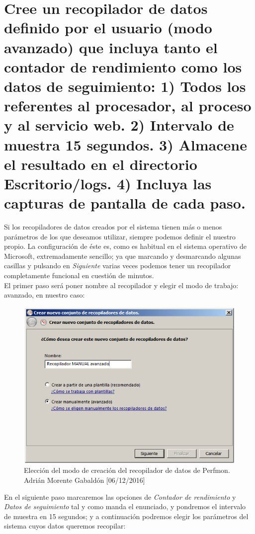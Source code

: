 \section{Cree un recopilador de datos definido por el usuario (modo avanzado) que incluya tanto el contador de rendimiento como los datos de seguimiento: 1) Todos los referentes al procesador, al proceso y al servicio web. 2) Intervalo de muestra 15 segundos. 3) Almacene el resultado en el directorio Escritorio/logs. 4) Incluya las capturas de pantalla de cada paso.}
Si los recopiladores de datos creados por el sistema tienen más o menos parámetros de los que deseamos utilizar, siempre podemos definir el nuestro propio. La configuración de éste es, como es habitual en el sistema operativo de Microsoft, extremadamente sencillo; ya que marcando y desmarcando algunas casillas y pulsando en \emph{Siguiente} varias veces podemos tener un recopilador completamente funcional en cuestión de minutos. \\
El primer paso será poner nombre al recopilador y elegir el modo de trabajo: avanzado, en nuestro caso:
\begin{figure}[H]
	\centering
	\includegraphics[scale=0.6]{recop1}
	\caption{Elección del modo de creación del recopilador de datos de Perfmon. Adrián Morente Gabaldón [06/12/2016]}
	\label{figura12}
\end{figure}
En el siguiente paso marcaremos las opciones de \emph{Contador de rendimiento} y \emph{Datos de seguimiento} tal y como manda el enunciado, y pondremos el intervalo de muestra en 15 segundos; y a continuación podremos elegir los parámetros del sistema cuyos datos queremos recopilar:
